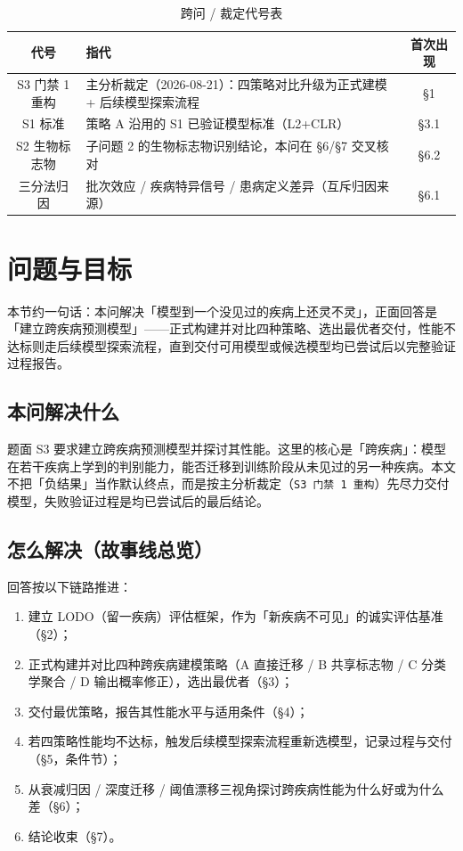 \documentclass{internal-report}
\begin{document}
\begin{table}[ht]
\centering
\caption{跨问 / 裁定代号表}
\begin{tabular}{c p{} c}
\toprule
\textbf{代号} & \textbf{指代} & \textbf{首次出现} \\
\midrule
S3 门禁 1 重构 & 主分析裁定（2026-08-21）：四策略对比升级为正式建模 + 后续模型探索流程 & §1 \\
S1 标准 & 策略 A 沿用的 S1 已验证模型标准（L2+CLR） & §3.1 \\
S2 生物标志物 & 子问题 2 的生物标志物识别结论，本问在 §6/§7 交叉核对 & §6.2 \\
三分法归因 & 批次效应 / 疾病特异信号 / 患病定义差异（互斥归因来源） & §6.1 \\
\bottomrule
\end{tabular}
\end{table}


\section{问题与目标}

本节约一句话：本问解决「模型到一个没见过的疾病上还灵不灵」，正面回答是「建立跨疾病预测模型」——正式构建并对比四种策略、选出最优者交付，性能不达标则走后续模型探索流程，直到交付可用模型或候选模型均已尝试后以完整验证过程报告。

\subsection{本问解决什么}
题面 S3 要求建立跨疾病预测模型并探讨其性能。这里的核心是「跨疾病」：模型在若干疾病上学到的判别能力，能否迁移到训练阶段从未见过的另一种疾病。本文不把「负结果」当作默认终点，而是按主分析裁定（\texttt{S3 门禁 1 重构}）先尽力交付模型，失败验证过程是均已尝试后的最后结论。

\subsection{怎么解决（故事线总览）}
回答按以下链路推进：
\begin{enumerate}
  \item 建立 LODO（留一疾病）评估框架，作为「新疾病不可见」的诚实评估基准（§2）；
  \item 正式构建并对比四种跨疾病建模策略（A 直接迁移 / B 共享标志物 / C 分类学聚合 / D 输出概率修正），选出最优者（§3）；
  \item 交付最优策略，报告其性能水平与适用条件（§4）；
  \item 若四策略性能均不达标，触发后续模型探索流程重新选模型，记录过程与交付（§5，条件节）；
  \item 从衰减归因 / 深度迁移 / 阈值漂移三视角探讨跨疾病性能为什么好或为什么差（§6）；
  \item 结论收束（§7）。
\end{enumerate}
\end{document}
